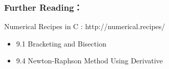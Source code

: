 \documentclass[11pt]{article}
\begin{document}
    \hypertarget{further-reading}{%
\subsubsection{Further Reading：}\label{further-reading}}

Numerical Recipes in C : http://numerical.recipes/

\begin{itemize}
\item
  9.1 Bracketing and Bisection
\item
  9.4 Newton-Raphson Method Using Derivative
\end{itemize}


    
    
    
    
\end{document}

